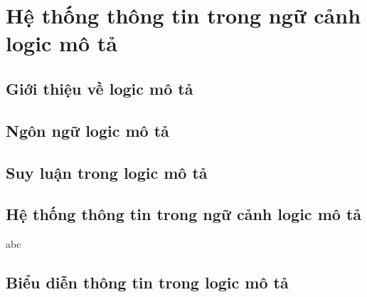 
\chapter{Hệ thống thông tin trong ngữ cảnh logic mô tả}
\label{chapter2}
\section{Giới thiệu về logic mô tả}

\section{Ngôn ngữ logic mô tả \ALC}

\section{Suy luận trong logic mô tả}

\section{Hệ thống thông tin trong ngữ cảnh logic mô tả}
abc
\section{Biểu diễn thông tin trong logic mô tả}

